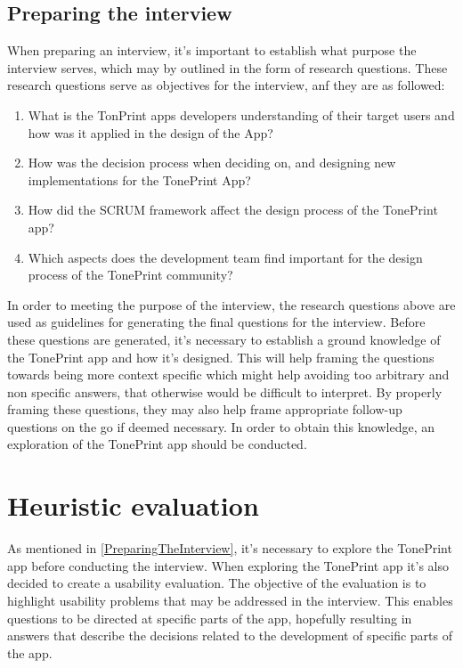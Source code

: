 \subsection{Preparing the interview}
\label{PreparingTheInterview}
When preparing an interview, it's important to establish what purpose the interview serves, which may by outlined in the form of research questions. These research questions serve as objectives for the interview, anf they are as followed:
\begin{enumerate}
	\item What is the TonPrint apps developers understanding of their target users and how was it applied in the design of the App?
	\item How was the decision process when deciding on, and designing new implementations for the TonePrint App?
	\item How did the SCRUM framework affect the design process of the TonePrint app?
	\item Which aspects does the development team find important for the design process of the TonePrint community?
\end{enumerate}

\noindent
In order to meeting the purpose of the interview, the research questions above are used as guidelines for generating the final questions for the interview. Before these questions are generated, it's necessary to establish a ground knowledge of the TonePrint app and how it's designed. This will help framing the questions towards being more context specific which might help avoiding too arbitrary and non specific answers, that otherwise would be difficult to interpret. By properly framing these questions, they may also help frame appropriate follow-up questions on the go if deemed necessary. In order to obtain this knowledge, an exploration of the TonePrint app should be conducted.

\section{Heuristic evaluation}
\label{SectionHeuristicEvaluation}
As mentioned in \autoref{PreparingTheInterview}, it's necessary to explore the TonePrint app before conducting the interview. When exploring the TonePrint app it's also decided to create a usability evaluation. The objective of the evaluation is to highlight usability problems that may be addressed in the interview. This enables questions to be directed at specific parts of the app, hopefully resulting in answers that describe the decisions related to the development of specific parts of the app.

